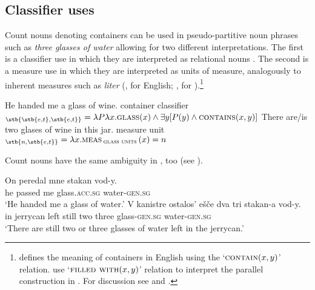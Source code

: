 \documentclass[output=paper,
colorlinks,
citecolor=brown,
newtxmath
]{langscibook}
\begin{document}
\subsection{Classifier uses}
Count nouns denoting containers can be used in pseudo-partitive noun phrases such as \textit{three glasses of water} allowing for two different interpretations. The first is a classifier use in which they are interpreted as relational nouns . The second is a measure use in which they are interpreted as units of measure, analogously to inherent measures such as \textit{liter}  (\citealt{Rothstein2009,Rothstein2017}, \citealt{Landman2004,Landman2016} for English; \citealt{Partee.Borschev2012}, \citealt{Khrizman2016,Khrizman2016b} for ).\footnote{\citet{Rothstein2009,Rothstein2017} defines the meaning of containers in English using the `$\textsc{contain}(x,y)$' relation. \citet{Partee.Borschev2012} use `$\textsc{filled with}(x,y)$' relation to interpret the parallel construction in . For discussion see \citet{Partee.Borschev2012} and \citet{Rothstein2017}.}

\ea\label{ex:khrizmann:27}
    \ea\label{ex:khrizmann:27a} He handed me a glass of wine. \hfill container classifier\\
    $_{\stb{\stb{e,t},\stb{e,t}}} = \lambda P \lambda x.\textsc{glass}(x) \wedge \exists y[P(y) \wedge \textsc{contains}(x,y)]$
    \ex\label{ex:khrizmann:27b} There are/is two glases of wine in this jar. \hfill measure unit\\
    $_{\stb{n,\stb{e,t}}} = \lambda x. \textsc{meas}\,_{\textsc{glass units}}\,(x) = n$
\z\z

\noindent Count nouns have the same ambiguity in , too  (see \citealt{Partee.Borschev2012,Khrizman.Rothstein2015,Khrizman2016,Khrizman2016b}).

\ea\label{ex:khrizmann:28}
    \ea \gll On peredal mne stakan vod-y.\\
    he passed me glass.\textsc{acc.sg} water-\textsc{gen.sg}\\
    \glt `He handed me a glass of water.'
    \ex \gll V kanistre ostalos' ešče dva tri stakan-a vod-y.\\
    in jerrycan left still two three glass-\textsc{gen.sg} water-\textsc{gen.sg}\\
    \glt `There are still two or three glasses of water left in the jerrycan.'
\z\z
\end{document}
